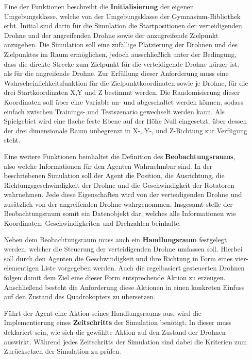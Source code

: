 Eine der Funktionen beschreibt die \textbf{Initialisierung} der eigenen Umgebungsklasse, welche von der Umgebungsklasse der Gymnasium-Bibliothek erbt.
Initial sind darin für die Simulation die Startpositionen der verteidigenden Drohne und der angreifenden Drohne sowie der anzugreifende Zielpunkt anzugeben.
Die Simulation soll eine zufällige Platzierung der Drohnen und des Zielpunktes im Raum ermöglichen, jedoch ausschließlich unter der Bedingung, dass die direkte Strecke zum Zielpunkt für die verteidigende Drohne kürzer ist, als für die angreifende Drohne.
Zur Erfüllung dieser Anforderung muss eine Wahrscheinlichkeitsfunktion für die Zielpunktkoordinaten sowie je Drohne, für die drei Startkoordinaten X,Y und Z bestimmt werden.
Die Randomisierung dieser Koordinaten soll über eine Variable an- und abgeschaltet werden können, sodass einfach zwischen Trainings- und Testszenario gewechselt werden kann.
Als Spielgebiet wird eine flache feste Ebene auf der Höhe Null eingesetzt, über dessen der drei dimensionale Raum unbegrenzt in X-, Y-, und Z-Richtung zur Verfügung steht.

Eine weitere Funktionen beinhaltet die Definition des \textbf{Beobachtungsraums}, also welche Informationen für den Agenten Wahrnehmbar sind. 
In der beschriebenen Simulation soll der Agent die Position, die Ausrichtung, die Richtungsgeschwindigkeit der Drohne und die Geschwindigkeit der Rotatoren wahrnehmen. 
Jede diese Eigenschaften wird von der verteidigenden Drohne und zusätzlich von der angreifenden Drohne wahrgenommen. 
Insgesamt stelle der Beobachtungsraum somit ein Datenobjekt dar, welches alle Informationen wie Koordinaten, Geschwindigkeiten und Drehzahlen beinhalte.

Neben dem Beobachtungsraum muss auch ein \textbf{Handlungsraum} festgelegt werden, welcher die Steuerung der verteidigenden Drohne umfassen soll.
Hierbei soll durch den Agenten die Geschwindigkeit und ihre Richtung in Form eines vier-elementigen Liste vorgegeben werden.
Auch die regelbasiert gesteuerten Drohnen folgen damit dem Ziel eine dieser Form entsprechende Aktion zu erzeugen.
Anschließend besteht die Anforderung diese Aktionen in einen konkreten Einfuss auf den Zustand des Quadrokopters zu übersetzen.

Führt der Agent eine Aktion seines Handlungsraums aus, wird die Implementierung eines \textbf{Zeitschritts} der Simulation benötigt.
In dieser muss deklariert sein, wie sich die gewählte Aktion auf den Zustand der Drohnen auswirkt.
Während jedes Zeitschritts der Simulation sind dabei die Kriterien zum Zurücksetzen der Simulation zu prüfen.

